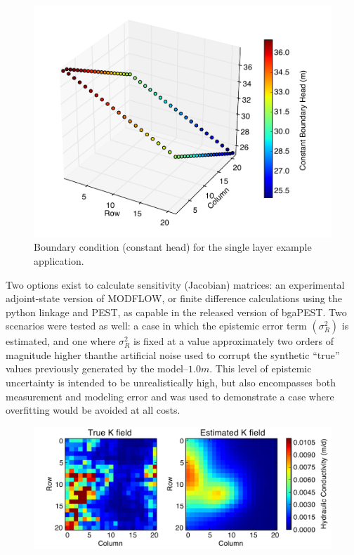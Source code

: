 \documentclass[11pt,oneside,onecolumn]{usgsreport}
\begin{document}
\begin{appendix}
\begin{figure}[!t]
\begin{center}\includegraphics[scale=0.5]{figures/starting_heads}\end{center}

\caption{\label{fig:stheads1L}Boundary condition (constant head) for the single
layer example application.}
\end{figure}


Two options exist to calculate sensitivity (Jacobian) matrices: an
experimental adjoint-state version of MODFLOW, or finite difference
calculations using the python linkage and PEST, as capable in the
released version of bgaPEST. Two scenarios were tested as well: a
case in which the epistemic error term $\left(\sigma_{R}^{2}\right)$
is estimated, and one where $\sigma_{R}^{2}$ is fixed at a value
approximately two orders of magnitude higher thanthe artificial noise
used to corrupt the synthetic ``true'' values previously generated
by the model--$1.0m$. This level of epistemic uncertainty is intended
to be unrealistically high, but also encompasses both measurement
and modeling error and was used to demonstrate a case where overfitting
would be avoided at all costs.

\begin{figure}[!t]
\begin{center} \includegraphics[scale=0.7]{figures/1_lay_best_pars_sigma_fixed}\end{center}


\end{figure}
\end{appendix}
\end{document}
